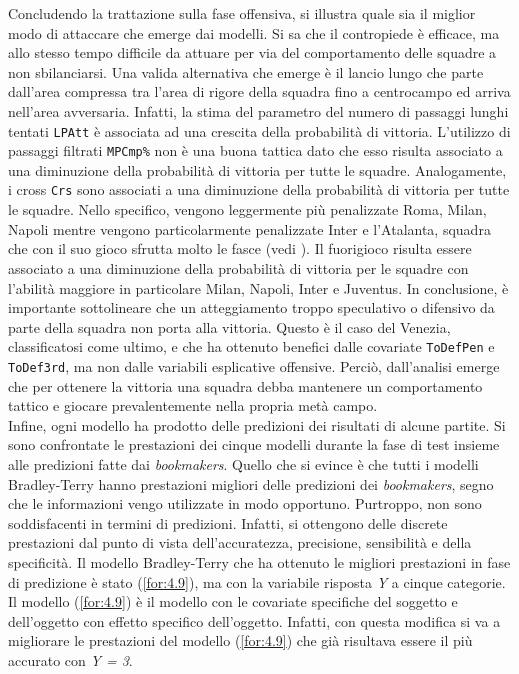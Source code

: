 Concludendo la trattazione sulla fase offensiva, si illustra quale sia il miglior modo di attaccare che emerge dai modelli. Si sa che il contropiede è efficace, ma allo stesso tempo difficile da attuare per via del comportamento delle squadre a non sbilanciarsi. Una valida alternativa che emerge è il lancio lungo che parte dall'area compressa tra l'area di rigore della squadra fino a centrocampo ed arriva nell'area avversaria. Infatti, la stima del parametro del numero di passaggi lunghi tentati \texttt{LPAtt} è associata ad una crescita della probabilità di vittoria. L'utilizzo di passaggi filtrati \texttt{MPCmp\%} non è una buona tattica dato che esso risulta associato a una diminuzione della probabilità di vittoria per tutte le squadre. Analogamente, i cross \texttt{Crs} sono associati a una diminuzione della probabilità di vittoria per tutte le squadre. Nello specifico, vengono leggermente più penalizzate Roma, Milan, Napoli mentre vengono particolarmente penalizzate Inter e l'Atalanta, squadra che con il suo gioco sfrutta molto le fasce (vedi \textit{\cite{ataGioco}}). Il fuorigioco risulta essere associato a una diminuzione della probabilità di vittoria per le squadre con l'abilità maggiore in particolare Milan, Napoli, Inter e Juventus. In conclusione, è importante sottolineare che un atteggiamento troppo speculativo o difensivo da parte della squadra non porta alla vittoria. Questo è il caso del Venezia, classificatosi come ultimo, e che ha ottenuto benefici dalle covariate \texttt{ToDefPen} e \texttt{ToDef3rd}, ma non dalle variabili esplicative offensive. Perciò, dall'analisi emerge che per ottenere la vittoria una squadra debba mantenere un comportamento tattico e giocare prevalentemente nella propria metà campo.\\
Infine, ogni modello ha prodotto delle predizioni dei risultati di alcune partite. Si sono confrontate le prestazioni dei cinque modelli durante la fase di test insieme alle predizioni fatte dai \emph{bookmakers}. Quello che si evince è che tutti i modelli Bradley-Terry hanno prestazioni migliori delle predizioni dei \emph{bookmakers}, segno che le informazioni vengo utilizzate in modo opportuno. Purtroppo, non sono soddisfacenti in termini di predizioni. Infatti, si ottengono delle discrete prestazioni dal punto di vista dell'accuratezza, precisione, sensibilità e della specificità. Il modello Bradley-Terry che ha ottenuto le migliori prestazioni in fase di predizione è stato (\ref{for:4.9}), ma con la variabile risposta \emph{Y} a cinque categorie. Il modello (\ref{for:4.9}) è il modello con le covariate specifiche del soggetto e dell'oggetto con effetto specifico dell'oggetto. Infatti, con questa modifica si va a migliorare le prestazioni del modello (\ref{for:4.9}) che già risultava essere il più accurato con \emph{Y = 3}.
